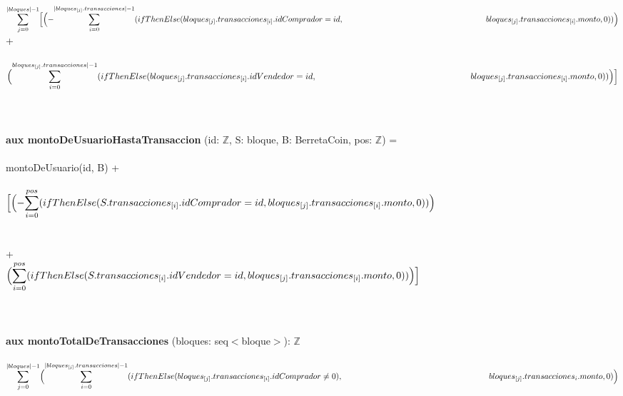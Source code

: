 \documentclass{article}
\newcommand{\Entero}{$\mathds{Z}$}
\begin{document}
        \indent\indent
        $\mathlarger\sum\limits_{j=0}^{|bloques| - 1}
        \Bigl[\Bigl(-\mathlarger\sum\limits_{i=0}^{|bloques_{[j]}.transacciones|-1} (ifThenElse (bloques_{[j]}.transacciones_{[i]}.idComprador = id,\\
        \indent\indent\indent\indent\indent\indent\indent\indent\indent\indent\indent\indent bloques_{[j]}.transacciones_{[i]}.monto, 0))\Bigr)$ \\

        \indent\indent\indent\indent\indent\indent\indent\indent+\\\\

        \indent\indent\indent\indent\indent
        $\Bigl(\mathlarger\sum\limits_{i=0}^{bloques_{[j]}.transacciones|-1} (ifThenElse (bloques_{[j]}.transacciones_{[i]}.idVendedor = id,\\
        \indent\indent\indent\indent\indent\indent\indent\indent\indent\indent\indent\indent bloques_{[j]}.transacciones_{[i]}.monto, 0))\Bigr)\Bigr]$\\\\\\\\

        {\selectfont\textbf{aux montoDeUsuarioHastaTransaccion} (id: \Entero, S: bloque, B: BerretaCoin, pos: \Entero)} =\\\\
        \indent\indent montoDeUsuario(id, B) +\\\\
        \indent\indent $\Bigl[\Bigl(-\mathlarger\sum\limits_{i=0}^{pos} (ifThenElse (S.transacciones_{[i]}.idComprador = id, bloques_{[j]}.transacciones_{[i]}.monto, 0))\Bigr)$\\\\\\
        \indent\indent\indent+\\

        \indent\indent $\Bigl(\mathlarger\sum\limits_{i=0}^{pos} (ifThenElse (S.transacciones_{[i]}.idVendedor = id, bloques_{[j]}.transacciones_{[i]}.monto, 0)) \Bigr)\Bigr]$\\\\\\\\


        {\selectfont\textbf{aux montoTotalDeTransacciones} (bloques: seq$<$bloque$>$): \Entero}\\\\
    \indent\indent $\mathlarger\sum\limits_{j=0}^{|bloques|-1} \Bigl(\mathlarger\sum\limits_{i=0}^{|bloques_{[j]}.transacciones|-1}
        (ifThenElse (bloques_{[j]}.transacciones_{[i]}.idComprador \ne 0),\\
        \indent\indent\indent\indent\indent\indent\indent\indent\indent\indent\indent\indent bloques_{[j]}.transacciones_{{i}}.monto, 0)\Bigr)$\\\\
\end{document}
